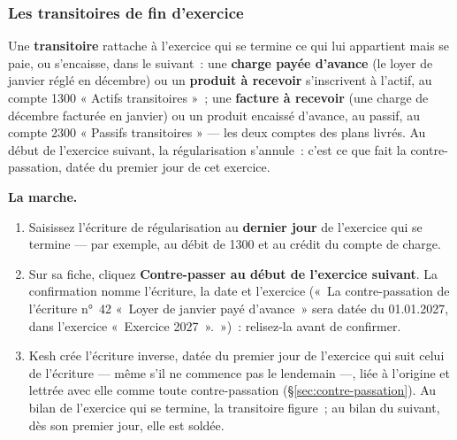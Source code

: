 \documentclass[a4paper,11pt,oneside]{article}
\begin{document}
\subsubsection{Les transitoires de fin d'exercice}\label{sec:transitoires}

Une \textbf{transitoire} rattache à l'exercice qui se termine ce qui lui appartient mais se
paie, ou s'encaisse, dans le suivant~: une \textbf{charge payée d'avance} (le loyer de janvier
réglé en décembre) ou un \textbf{produit à recevoir} s'inscrivent à l'actif, au compte 1300
« Actifs transitoires »~; une \textbf{facture à recevoir} (une charge de décembre facturée en
janvier) ou un produit encaissé d'avance, au passif, au compte 2300 « Passifs transitoires »
--- les deux comptes des plans livrés. Au début de l'exercice suivant, la régularisation
s'annule~: c'est ce que fait la contre-passation, datée du premier jour de cet exercice.

\textbf{La marche.}
\begin{enumerate}
    \item Saisissez l'écriture de régularisation au \textbf{dernier jour} de l'exercice qui se
          termine --- par exemple, au débit de 1300 et au crédit du compte de charge.
    \item Sur sa fiche, cliquez \textbf{Contre-passer au début de l'exercice suivant}. La
          confirmation nomme l'écriture, la date et l'exercice («~La contre-passation de
          l'écriture n°~42 «~Loyer de janvier payé d'avance~» sera datée du 01.01.2027, dans
          l'exercice «~Exercice 2027~».~»)~: relisez-la avant de confirmer.
    \item Kesh crée l'écriture inverse, datée du premier jour de l'exercice qui suit celui de
          l'écriture --- même s'il ne commence pas le lendemain ---, liée à l'origine et
          lettrée avec elle comme toute contre-passation (\S\ref{sec:contre-passation}). Au
          bilan de l'exercice qui se termine, la transitoire figure~; au bilan du suivant,
          dès son premier jour, elle est soldée.
\end{enumerate}
\end{document}
